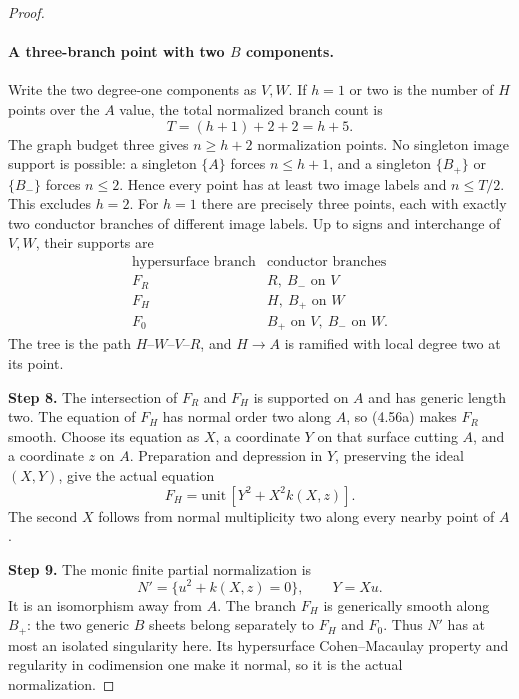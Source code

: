 \begin{proof}
\paragraph{A three-branch point with two $B$ components.}
Write the two degree-one components as $V,W$. If $h=1$
or two is the number of $H$ points over the $A$ value,
the total normalized branch count is
\[
                         T=(h+1)+2+2=h+5.
\]
The graph budget three gives $n\ge h+2$ normalization
points. No singleton image support is possible: a
singleton $\{A\}$ forces $n\le h+1$, and a singleton
$\{B_+\}$ or $\{B_-\}$ forces $n\le2$. Hence every
point has at least two image labels and $n\le T/2$.
This excludes $h=2$. For $h=1$ there are precisely
three points, each with exactly two conductor branches
of different image labels. Up to signs and interchange
of $V,W$, their supports are
\[
 \begin{array}{c|c}
 \text{hypersurface branch}&\text{conductor branches}\\ \hline
 F_R&R,\ B_-\text{ on }V\\
 F_H&H,\ B_+\text{ on }W\\
 F_0&B_+\text{ on }V,\ B_-\text{ on }W.
 \end{array}
                                                            \tag{4.56b}
\]
The tree is the path $H$--$W$--$V$--$R$, and $H\to A$
is ramified with local degree two at its point.

\noindent\textbf{Step 8.} The intersection of $F_R$ and $F_H$ is supported on $A$
and has generic length two. The equation of $F_H$ has
normal order two along $A$, so (4.56a) makes $F_R$
smooth. Choose its equation as $X$, a coordinate $Y$
on that surface cutting $A$, and a coordinate $z$ on
$A$. Preparation and depression in $Y$, preserving the
ideal $(X,Y)$, give the actual equation
\[
                       F_H=\text{unit}\,[Y^2+X^2k(X,z)].
                                                            \tag{4.56c}
\]
The second $X$ follows from normal multiplicity two
along every nearby point of $A$.

\noindent\textbf{Step 9.} The monic finite partial normalization is
\[
      N'=\{u^2+k(X,z)=0\},\qquad Y=Xu.
                                                            \tag{4.56d}
\]
It is an isomorphism away from $A$. The branch $F_H$
is generically smooth along $B_+$: the two generic
$B$ sheets belong separately to $F_H$ and $F_0$.
Thus $N'$ has at most an isolated singularity here.
Its hypersurface Cohen--Macaulay property and regularity
in codimension one make it normal, so it is the actual
normalization.


\end{proof}
